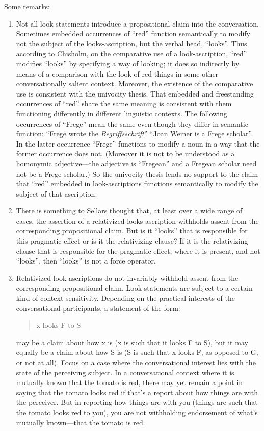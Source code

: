 \documentclass[11pt]{article}
\begin{document}
Some remarks:
\begin{enumerate}
    \item Not all look statements introduce a propositional claim into the conversation. Sometimes embedded occurrences of ``red'' function semantically to modify not the subject of the looks-ascription, but the verbal head, ``looks''. Thus according to Chisholm, on the comparative use of a look-ascription, ``red'' modifies ``looks'' by specifying a way of looking; it does so indirectly by means of a comparison with the look of red things in some other conversationally salient context. Moreover, the existence of the comparative use is consistent with the univocity thesis. That embedded and freestanding occurrences of ``red'' share the same meaning is consistent with them functioning differently in different linguistic contexts. The following occurrences of ``Frege'' mean the same even though they differ in semantic function: ``Frege wrote the \emph{Begriffsschrift}'' ``Joan Weiner is a Frege scholar''. In the latter occurrence ``Frege'' functions to modify a noun in a way that the former occurrence does not. (Moreover it is not to be understood as a homonymic adjective---the adjective is ``Fregean'' and a Fregean scholar need not be a Frege scholar.) So the univocity thesis lends no support to the claim that ``red'' embedded in look-ascriptions functions semantically to modify the subject of that ascription.
    \item There is something to Sellars thought that, at least over a wide range of cases, the assertion of a relativized looks-ascription withholds assent from the corresponding propositional claim. But is it ``looks'' that is responsible for this pragmatic effect or is it the relativizing clause? If it is the relativizing clause that is responsible for the pragmatic effect, where it is present, and not ``looks'', then ``looks'' is not a force operator.
    \item Relativized look ascriptions do not invariably withhold assent from the corresponding propositional claim. Look statements are subject to a certain kind of context sensitivity. Depending on the practical interests of the conversational participants, a statement of the form:
    \begin{quote}
        x looks F to S
    \end{quote}
    may be a claim about how x is (x is such that it looks F to S), but it may equally be a claim about how S is (S is such that x looks F, as opposed to G, or not at all). Focus on a case where the conversational interest lies with the state of the perceiving subject. In a conversational context where it is mutually known that the tomato is red, there may yet remain a point in saying that the tomato looks red if that's a report about how things are with the perceiver. But in reporting how things are with you (things are such that the tomato looks red to you), you are not withholding endorsement of what's mutually known---that the tomato is red.
\end{enumerate}
\end{document}
